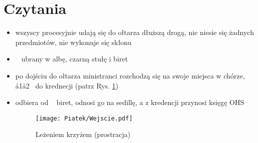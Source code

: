 \section{Czytania}

\begin{itemize}
      \item wszyscy procesyjnie udają się do ołtarza dłuższą drogą, nie niesie
            się żadnych przedmiotów, nie wykonuje się skłonu
      \item \ii~ ubrany w albę, czarną stułę i biret
      \item po dojściu do ołtarza ministranci rozchodzą się na swoje miejsca w
            chórze, \aa1\aa2~ do krednecji (patrz Rys. \ref{fig:lezenie})
      \item {} odbiera od \ii~ biret, odnosi go na sedillę, a z kredencji
            przynosi księgę OHS

            \begin{figure}[h]
                  \centering
                  \texttt{[image: Piatek/Wejscie.pdf]}
                  \caption{Leżeniem krzyżem (prostracja)}
                  \label{fig:lezenie}
            \end{figure}


\end{itemize}
